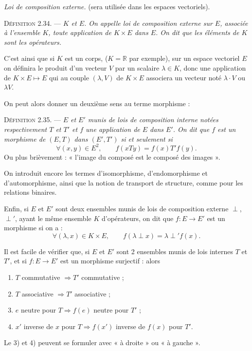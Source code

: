 \medskip\noindent\emph{Loi de composition externe.} (sera utilisée dans les espaces vectoriels).

\medskip\noindent\textsc{Définition 2.34.} --- \emph{ $K$ et $E$. On appelle loi de composition externe sur $E$, associée à l'ensemble $K$, toute application de $K\times E$ dans $E$. On dit que les éléments de $K$ sont les opérateurs.}

C'est ainsi que si $K$ est un corps, ($K=\mathbb R$ par exemple), sur un espace vectoriel $E$ on définira le produit d'un vecteur $V$ par un scalaire $\lambda\in K$, donc une application de $K\times E\longmapsto E$ qui au couple $(\lambda,V)$ de $K\times E$ associera un vecteur noté $\lambda\cdot V$ ou $\lambda V$.

On peut alors donner un deuxième sens au terme morphisme :

\medskip\noindent\textsc{Définition 2.35.} --- \emph{ $E$ et $E'$ munis de lois de composition interne notées respectivement $T$ et $T'$ et $f$ une application de $E$ dans $E'$. On dit que $f$ est un morphisme de $(E,T)$ dans $(E',T')$ si et seulement si}
\[
\forall(x,y)\in E^2,\qquad f(xTy)=f(x)T'f(y).
\]
Ou plus brièvement : « l'image du composé est le composé des images ».

On introduit encore les termes d'isomorphisme, d'endomorphisme et d'automorphisme, ainsi que la notion de transport de structure, comme pour les relations binaires.

Enfin, si $E$ et $E'$ sont deux ensembles munis de lois de composition externe $\perp$, $\perp'$, ayant le même ensemble $K$ d'opérateurs, on dit que $f:E\to E'$ est un morphisme si on a :
\[
\forall(\lambda,x)\in K\times E,\qquad f(\lambda\perp x)=\lambda\perp' f(x).
\]

Il est facile de vérifier que, si $E$ et $E'$ sont 2 ensembles munis de lois internes $T$ et $T'$, et si $f:E\to E'$ est un morphisme surjectif : alors
\begin{enumerate}[label=\arabic*)]
\item $T$ commutative $\Rightarrow T'$ commutative ;
\item $T$ associative $\Rightarrow T'$ associative ;
\item $e$ neutre pour $T\Rightarrow f(e)$ neutre pour $T'$ ;
\item $x'$ inverse de $x$ pour $T\Rightarrow f(x')$ inverse de $f(x)$ pour $T'$.
\end{enumerate}
Le 3) et 4) peuvent se formuler avec « à droite » ou « à gauche ».

